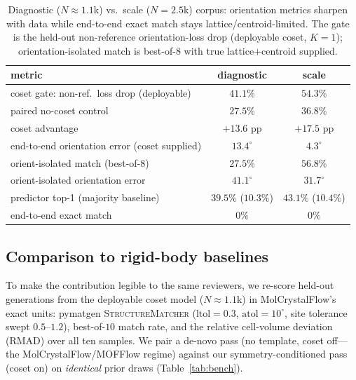 \documentclass[journal=acsodf,manuscript=article]{achemso}
\begin{document}
\begin{table}[t]\centering
\caption{Diagnostic ($N\!\approx\!1.1$k) vs.\ scale ($N\!=\!2.5$k) corpus:
orientation metrics sharpen with data while end-to-end exact match stays
lattice/centroid-limited. The gate is the held-out non-reference orientation-loss
drop (deployable coset, $K{=}1$); orientation-isolated match is best-of-$8$ with
true lattice$+$centroid supplied.}
\label{tab:scale}
\begin{tabular}{lcc}\toprule
metric & diagnostic & scale \\\midrule
coset gate: non-ref.\ loss drop (deployable) & $41.1\%$ & $\mathbf{54.3\%}$ \\
\quad paired no-coset control                & $27.5\%$ & $36.8\%$ \\
\quad coset advantage                        & $+13.6$ pp & $\mathbf{+17.5}$ pp \\
end-to-end orientation error (coset supplied)& $13.4^\circ$ & $\mathbf{4.3^\circ}$ \\
orient-isolated match (best-of-$8$)          & $27.5\%$ & $\mathbf{56.8\%}$ \\
orient-isolated orientation error            & $41.1^\circ$ & $\mathbf{31.7^\circ}$ \\
predictor top-1 (majority baseline)          & $39.5\%$ ($10.3\%$) & $43.1\%$ ($10.4\%$) \\
end-to-end exact match                       & $0\%$ & $0\%$ \\\bottomrule
\end{tabular}
\end{table}

\subsection{Comparison to rigid-body baselines}\label{sec:bench}
To make the contribution legible to the same reviewers, we re-score held-out
generations from the deployable coset model ($N\!\approx\!1.1$k) in
MolCrystalFlow's exact units\cite{zeng2026molcrystalflow}: pymatgen
\textsc{StructureMatcher} ($\text{ltol}{=}0.3$, $\text{atol}{=}10^\circ$, site
tolerance swept $0.5$--$1.2$), best-of-$10$ match rate, and the relative
cell-volume deviation (RMAD) over all ten samples. We pair a de-novo pass (no
template, coset off---the MolCrystalFlow/MOFFlow regime) against our
symmetry-conditioned pass (coset on) on \emph{identical} prior draws
(Table~\ref{tab:bench}).
\end{document}
